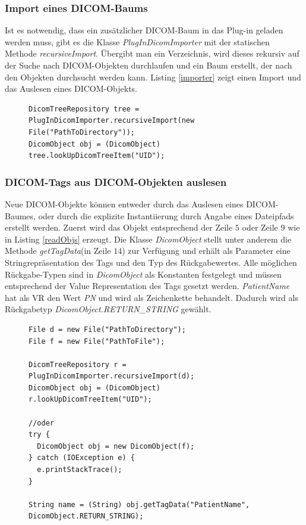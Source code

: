 \subsubsection{Import eines DICOM-Baums}

Ist es notwendig, dass ein zusätzlicher DICOM-Baum in das Plug-in geladen werden muss, gibt es die Klasse \textit{PlugInDicomImporter} mit der statischen Methode \textit{recursiveImport}. Übergibt man ein Verzeichnis, wird dieses rekursiv auf der Suche nach DICOM-Objekten durchlaufen und ein Baum erstellt, der nach den Objekten durchsucht werden kann. Listing \ref{importer} zeigt einen Import und das Auslesen eines DICOM-Objekts.

\begin{figure}[htbp]
\begin{lstlisting}[frame=leftline]
DicomTreeRepository tree = PlugInDicomImporter.recursiveImport(new File("PathToDirectory"));
DicomObject obj = (DicomObject) tree.lookUpDicomTreeItem("UID");
\end{lstlisting}
\end{figure}

\subsubsection{DICOM-Tags aus DICOM-Objekten auslesen}
Neue DICOM-Objekte können entweder durch das Auslesen eines DICOM-Baumes, oder durch die explizite Instantiierung durch Angabe eines Dateipfads erstellt werden. Zuerst wird das Objekt entsprechend der Zeile $5$ oder Zeile $9$ wie in Listing \ref{readObjs} erzeugt. Die Klasse \textit{DicomObject} stellt unter anderem die Methode \textit{getTagData}(in Zeile $14$) zur Verfügung und erhält als Parameter eine Stringrepräsentation des Tags und den Typ des Rückgabewertes. Alle möglichen Rückgabe-Typen sind in \textit{DicomObject} als Konstanten festgelegt und müssen entsprechend der Value Representation des Tags gesetzt werden. \textit{PatientName} hat als VR den Wert \textit{PN} und wird als Zeichenkette behandelt. Dadurch wird als Rückgabetyp \textit{DicomObject.RETURN\_STRING} gewählt.

\begin{figure}[htbp]
\begin{lstlisting}[frame=leftline]
File d = new File("PathToDirectory");
File f = new File("PathToFile");
		
DicomTreeRepository r = PlugInDicomImporter.recursiveImport(d);
DicomObject obj = (DicomObject) r.lookUpDicomTreeItem("UID");
		
//oder
try {
  DicomObject obj = new DicomObject(f);
} catch (IOException e) {
  e.printStackTrace();
}
		
String name = (String) obj.getTagData("PatientName", DicomObject.RETURN_STRING);
\end{lstlisting}
\end{figure}

